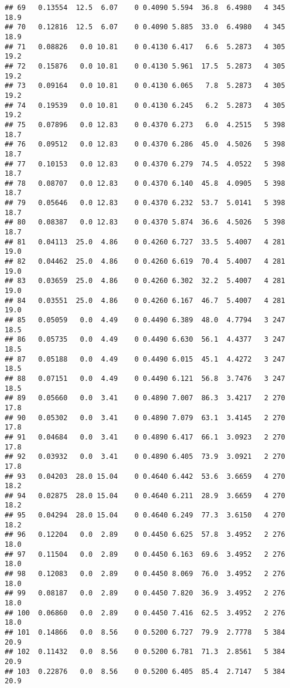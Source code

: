 \documentclass[]{article}
\begin{document}
\begin{verbatim}
## 69   0.13554  12.5  6.07    0 0.4090 5.594  36.8  6.4980   4 345    18.9
## 70   0.12816  12.5  6.07    0 0.4090 5.885  33.0  6.4980   4 345    18.9
## 71   0.08826   0.0 10.81    0 0.4130 6.417   6.6  5.2873   4 305    19.2
## 72   0.15876   0.0 10.81    0 0.4130 5.961  17.5  5.2873   4 305    19.2
## 73   0.09164   0.0 10.81    0 0.4130 6.065   7.8  5.2873   4 305    19.2
## 74   0.19539   0.0 10.81    0 0.4130 6.245   6.2  5.2873   4 305    19.2
## 75   0.07896   0.0 12.83    0 0.4370 6.273   6.0  4.2515   5 398    18.7
## 76   0.09512   0.0 12.83    0 0.4370 6.286  45.0  4.5026   5 398    18.7
## 77   0.10153   0.0 12.83    0 0.4370 6.279  74.5  4.0522   5 398    18.7
## 78   0.08707   0.0 12.83    0 0.4370 6.140  45.8  4.0905   5 398    18.7
## 79   0.05646   0.0 12.83    0 0.4370 6.232  53.7  5.0141   5 398    18.7
## 80   0.08387   0.0 12.83    0 0.4370 5.874  36.6  4.5026   5 398    18.7
## 81   0.04113  25.0  4.86    0 0.4260 6.727  33.5  5.4007   4 281    19.0
## 82   0.04462  25.0  4.86    0 0.4260 6.619  70.4  5.4007   4 281    19.0
## 83   0.03659  25.0  4.86    0 0.4260 6.302  32.2  5.4007   4 281    19.0
## 84   0.03551  25.0  4.86    0 0.4260 6.167  46.7  5.4007   4 281    19.0
## 85   0.05059   0.0  4.49    0 0.4490 6.389  48.0  4.7794   3 247    18.5
## 86   0.05735   0.0  4.49    0 0.4490 6.630  56.1  4.4377   3 247    18.5
## 87   0.05188   0.0  4.49    0 0.4490 6.015  45.1  4.4272   3 247    18.5
## 88   0.07151   0.0  4.49    0 0.4490 6.121  56.8  3.7476   3 247    18.5
## 89   0.05660   0.0  3.41    0 0.4890 7.007  86.3  3.4217   2 270    17.8
## 90   0.05302   0.0  3.41    0 0.4890 7.079  63.1  3.4145   2 270    17.8
## 91   0.04684   0.0  3.41    0 0.4890 6.417  66.1  3.0923   2 270    17.8
## 92   0.03932   0.0  3.41    0 0.4890 6.405  73.9  3.0921   2 270    17.8
## 93   0.04203  28.0 15.04    0 0.4640 6.442  53.6  3.6659   4 270    18.2
## 94   0.02875  28.0 15.04    0 0.4640 6.211  28.9  3.6659   4 270    18.2
## 95   0.04294  28.0 15.04    0 0.4640 6.249  77.3  3.6150   4 270    18.2
## 96   0.12204   0.0  2.89    0 0.4450 6.625  57.8  3.4952   2 276    18.0
## 97   0.11504   0.0  2.89    0 0.4450 6.163  69.6  3.4952   2 276    18.0
## 98   0.12083   0.0  2.89    0 0.4450 8.069  76.0  3.4952   2 276    18.0
## 99   0.08187   0.0  2.89    0 0.4450 7.820  36.9  3.4952   2 276    18.0
## 100  0.06860   0.0  2.89    0 0.4450 7.416  62.5  3.4952   2 276    18.0
## 101  0.14866   0.0  8.56    0 0.5200 6.727  79.9  2.7778   5 384    20.9
## 102  0.11432   0.0  8.56    0 0.5200 6.781  71.3  2.8561   5 384    20.9
## 103  0.22876   0.0  8.56    0 0.5200 6.405  85.4  2.7147   5 384    20.9

\end{verbatim}
\end{document}
